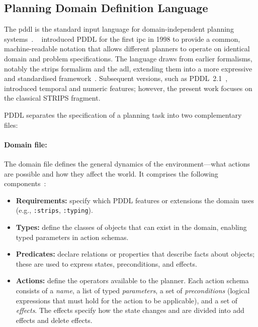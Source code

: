 \subsection{Planning Domain Definition Language}
\label{sec:bg:pddl}

The \gls{pddl} is the standard input language for domain-independent planning systems~\cite{McDermott1998}.
\citeauthor{McDermott1998}~\cite{McDermott1998} introduced PDDL for the first \gls{ipc} in 1998 to provide a common, machine-readable notation that allows different planners to operate on identical domain and problem specifications.
The language draws from earlier formalisms, notably the \gls{strips} formalism and the \gls{adl}, extending them into a more expressive and standardised framework~\cite{McDermott1998, GhallabNauTraverso2004}.
Subsequent versions, such as PDDL~2.1~\cite{FoxLong2003}, introduced temporal and numeric features; however, the present work focuses on the classical STRIPS fragment.

PDDL separates the specification of a planning task into two complementary files:

\paragraph{Domain file:}
The domain file defines the general dynamics of the environment---what actions are possible and how they affect the world.
It comprises the following components~\cite{McDermott1998}:
\begin{itemize}
  \item \textbf{Requirements:} specify which PDDL features or extensions the domain uses (e.g., \texttt{:strips}, \texttt{:typing}).
  \item \textbf{Types:} define the classes of objects that can exist in the domain, enabling typed parameters in action schemas.
  \item \textbf{Predicates:} declare relations or properties that describe facts about objects; these are used to express states, preconditions, and effects.
  \item \textbf{Actions:} define the operators available to the planner. Each action schema consists of a \emph{name}, a list of typed \emph{parameters}, a set of \emph{preconditions} (logical expressions that must hold for the action to be applicable), and a set of \emph{effects}. The effects specify how the state changes and are divided into add effects and delete effects.
\end{itemize}

